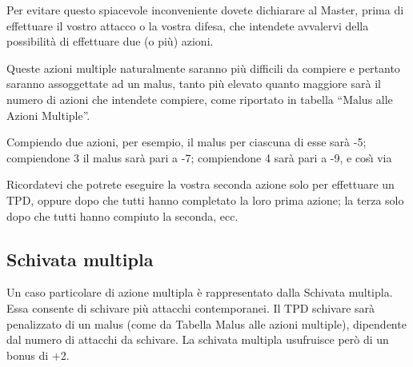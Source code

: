 Per evitare questo spiacevole inconveniente dovete dichiarare al
Master, prima di effettuare il vostro attacco o la vostra difesa, che
intendete avvalervi della possibilit\`a di effettuare due (o pi\`u)
azioni.

Queste azioni multiple naturalmente saranno pi\`u difficili da
compiere e pertanto saranno assoggettate ad un malus,
tanto pi\`u elevato quanto maggiore sar\`a il numero di
azioni che intendete compiere, come riportato in tabella
``Malus alle Azioni Multiple''.

Compiendo due azioni, per esempio, il malus per ciascuna di esse
sar\`a -5; compiendone 3 il malus sar\`a pari a -7; compiendone 4
sar\`a pari a -9, e cos\`{\i} via

Ricordatevi che potrete eseguire la vostra seconda azione solo per
effettuare un TPD, oppure dopo che tutti hanno completato la loro
prima azione; la terza solo dopo che tutti hanno compiuto la seconda,
ecc.




\subsection{Schivata multipla} 

Un caso particolare di azione multipla \`e rappresentato dalla
Schivata multipla. Essa consente di schivare pi\`u attacchi
contemporanei.  Il TPD schivare sar\`a penalizzato di un malus (come
da Tabella Malus alle azioni multiple), dipendente dal numero di
attacchi da schivare. La schivata multipla usufruisce per\`o di un
bonus di +2.

